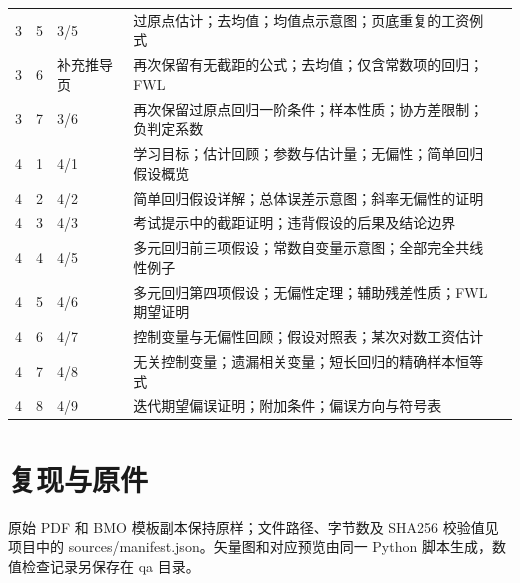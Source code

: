 \begin{longtable}{P{1.05cm}P{.8cm}P{2.25cm}P{9.7cm}P{.9cm}}
3 & 5 & 3/5 & 过原点估计；去均值；均值点示意图；页底重复的工资例式 & \hyperref[src:w3p5]{\pageref*{src:w3p5}}\\
3 & 6 & 补充推导页 & 再次保留有无截距的公式；去均值；仅含常数项的回归；FWL & \hyperref[src:w3p6]{\pageref*{src:w3p6}}\\
3 & 7 & 3/6 & 再次保留过原点回归一阶条件；样本性质；协方差限制；负判定系数 & \hyperref[src:w3p7]{\pageref*{src:w3p7}}\\
4 & 1 & 4/1 & 学习目标；估计回顾；参数与估计量；无偏性；简单回归假设概览 & \hyperref[src:w4p1]{\pageref*{src:w4p1}}\\
4 & 2 & 4/2 & 简单回归假设详解；总体误差示意图；斜率无偏性的证明 & \hyperref[src:w4p2]{\pageref*{src:w4p2}}\\
4 & 3 & 4/3 & 考试提示中的截距证明；违背假设的后果及结论边界 & \hyperref[src:w4p3]{\pageref*{src:w4p3}}\\
4 & 4 & 4/5 & 多元回归前三项假设；常数自变量示意图；全部完全共线性例子 & \hyperref[src:w4p4]{\pageref*{src:w4p4}}\\
4 & 5 & 4/6 & 多元回归第四项假设；无偏性定理；辅助残差性质；FWL 期望证明 & \hyperref[src:w4p5]{\pageref*{src:w4p5}}\\
4 & 6 & 4/7 & 控制变量与无偏性回顾；假设对照表；某次对数工资估计 & \hyperref[src:w4p6]{\pageref*{src:w4p6}}\\
4 & 7 & 4/8 & 无关控制变量；遗漏相关变量；短长回归的精确样本恒等式 & \hyperref[src:w4p7]{\pageref*{src:w4p7}}\\
4 & 8 & 4/9 & 迭代期望偏误证明；附加条件；偏误方向与符号表 & \hyperref[src:w4p8]{\pageref*{src:w4p8}}\\
\end{longtable}\normalsize
\section*{复现与原件}
原始 PDF 和 BMO 模板副本保持原样；文件路径、字节数及 SHA256 校验值见项目中的 sources/manifest.json。矢量图和对应预览由同一 Python 脚本生成，数值检查记录另保存在 qa 目录。
